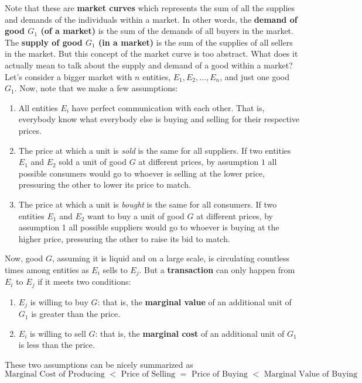 \documentclass{article}
\begin{document}
    Note that these are \textbf{market curves} which represents the sum of all the supplies and demands of the individuals within a market. In other words, the \textbf{demand of good $G_1$ (of a market)} is the sum of the demands of all buyers in the market. The \textbf{supply of good $G_1$ (in a market)} is the sum of the supplies of all sellers in the market. But this concept of the market curve is too abstract. What does it actually mean to talk about the supply and demand of a good within a market? Let's consider a bigger market with $n$ entities, $E_1, E_2, \ldots, E_n$, and just one good $G_1$. Now, note that we make a few assumptions:
    \begin{enumerate}
      \item All entities $E_i$ have perfect communication with each other. That is, everybody know what everybody else is buying and selling for their respective prices.
      \item The price at which a unit is \textit{sold} is the same for all suppliers. If two entities $E_1$ and $E_2$ sold a unit of good $G$ at different prices, by assumption $1$ all possible consumers would go to whoever is selling at the lower price, pressuring the other to lower its price to match.
      \item The price at which a unit is \textit{bought} is the same for all consumers. If two entities $E_1$ and $E_2$ want to buy a unit of good $G$ at different prices, by assumption 1 all possible suppliers would go to whoever is buying at the higher price, pressuring the other to raise its bid to match.
    \end{enumerate}
    Now, good $G$, assuming it is liquid and on a large scale, is circulating countless times among entities as $E_i$ sells to $E_j$. But a \textbf{transaction} can only happen from $E_i$ to $E_j$ if it meets two conditions:
    \begin{enumerate}
      \item $E_j$ is willing to buy $G$: that is, the \textbf{marginal value} of an additional unit of $G_1$ is greater than the price.
      \item $E_i$ is willing to sell $G$: that is, the \textbf{marginal cost} of an additional unit of $G_1$ is less than the price.
    \end{enumerate}
    These two assumptions can be nicely summarized as
    \begin{equation}
      \text{Marginal Cost of Producing } < \text{ Price of Selling } = \text{ Price of Buying } < \text{ Marginal Value of Buying}
    \end{equation}
\end{document}
